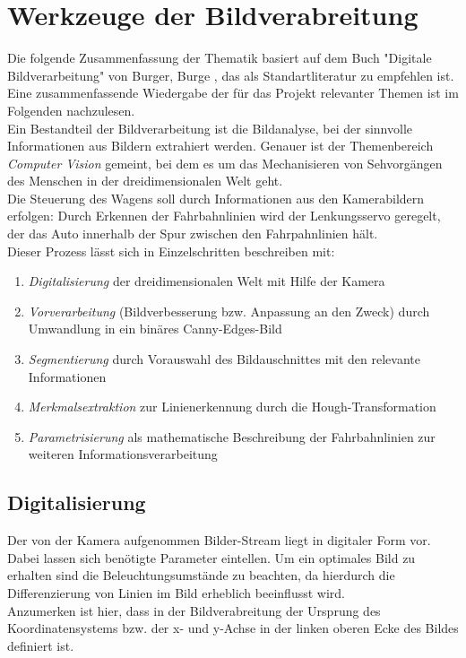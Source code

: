 \section{Werkzeuge der Bildverabreitung}
Die folgende Zusammenfassung der Thematik basiert auf dem Buch
"Digitale Bildverarbeitung" von Burger, Burge \citep{BurgeDigitBild}, das als 
Standartliteratur zu empfehlen ist. Eine zusammenfassende Wiedergabe der für 
das Projekt relevanter Themen ist im Folgenden nachzulesen.\\
Ein Bestandteil der Bildverarbeitung ist die Bildanalyse, bei der
sinnvolle Informationen aus Bildern extrahiert werden. Genauer ist der Themenbereich
\textit{Computer Vision} gemeint, bei dem es um das Mechanisieren von
Sehvorgängen des Menschen in der dreidimensionalen Welt geht.\\
Die Steuerung des Wagens soll durch Informationen aus den Kamerabildern
erfolgen: Durch Erkennen der Fahrbahnlinien wird der Lenkungsservo geregelt, der
das Auto innerhalb der Spur zwischen den Fahrpahnlinien hält.\\
Dieser Prozess lässt sich in Einzelschritten beschreiben mit:
\begin{enumerate}
  \item \textit{Digitalisierung} der dreidimensionalen Welt mit Hilfe der Kamera
  \item \textit{Vorverarbeitung} (Bildverbesserung bzw. Anpassung an den Zweck) durch
    Umwandlung in ein binäres Canny-Edges-Bild
  \item \textit{Segmentierung} durch Vorauswahl des Bildauschnittes mit den relevante
    Informationen
  \item \textit{Merkmalsextraktion} zur Linienerkennung durch die Hough-Transformation
  \item \textit{Parametrisierung} als mathematische  Beschreibung der Fahrbahnlinien zur
    weiteren Informationsverarbeitung
\end{enumerate}

\subsection{Digitalisierung}
Der von der Kamera aufgenommen Bilder-Stream liegt in digitaler Form vor. Dabei lassen
sich benötigte Parameter eintellen. Um ein optimales Bild zu
erhalten sind die Beleuchtungsumstände zu beachten, da hierdurch die
Differenzierung von Linien im Bild erheblich beeinflusst wird.\\
Anzumerken ist hier, dass in der Bildverabreitung der Ursprung des
Koordinatensystems bzw. der x- und y-Achse in der linken
oberen Ecke des Bildes definiert ist.

